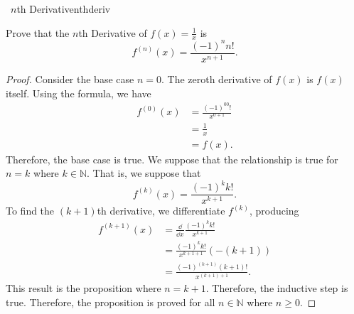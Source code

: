     \begin{exercise}{\Difficulty\,\Difficulty\,\,\(n\)th Derivative}{nthderiv}
    
        Prove that the \(n\)th Derivative of \(f(x)=\frac{1}{x}\) is
        \begin{equation*}
            f^{(n)}(x)=\frac{(-1)^nn!}{x^{n+1}}.
        \end{equation*}
        \begin{proof}
            Consider the base case \(n=0\). The zeroth derivative of \(f(x)\) is \(f(x)\) itself. Using the formula, we have
            \begin{align*}
                f^{(0)}(x)&=\frac{(-1)^00!}{x^{0+1}} \\
                &=\frac{1}{x} \\
                &=f(x).
            \end{align*}
            Therefore, the base case is true. We suppose that the relationship is true for \(n=k\) where \(k\in\mathbb{N}\). That is, we suppose that
            \begin{equation*}
                f^{(k)}(x)=\frac{(-1)^kk!}{x^{k+1}}.
            \end{equation*}
            To find the \((k+1)\)th derivative, we differentiate \(f^{(k)}\), producing
            \begin{align*}
                f^{(k+1)}(x)&=\frac{\dd}{\dd x}\frac{(-1)^kk!}{x^{k+1}} \\
                &=\frac{(-1)^kk!}{x^{k+1+1}}(-(k+1)) \\
                &=\frac{(-1)^{(k+1)}(k+1)!}{x^{(k+1)+1}}.
            \end{align*}
            This result is the proposition where \(n=k+1\). Therefore, the inductive step is true. Therefore, the proposition is proved for all \(n\in\mathbb{N}\) where \(n\geq0\).
        \end{proof}
    
    \end{exercise}
    \pagebreak
